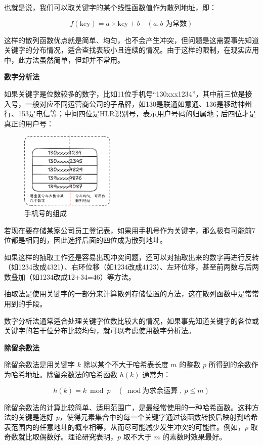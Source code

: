 \documentclass[lang=cn,newtx,10pt,scheme=chinese]{../elegantbook}
\begin{document}
也就是说，我们可以取关键字的某个线性函数值作为散列地址，即：

\[
f(\text{key}) = a \times \text{key} + b \quad (a, b \text{ 为常数})
\]

这样的散列函数优点就是简单、均匀，也不会产生冲突，但问题是这需要事先知道关键字的分布情况，适合查找表较小且连续的情况。由于这样的限制，在现实应用中，此方法虽然简单，但却并不常用。

\textbf{数字分析法}

如果关键字是位数较多的数字，比如11位手机号“130xxx1234”，其中前三位是接入号，一般对应不同运营商公司的子品牌，如130是联通如意通、136是移动神州行、153是电信等；中间四位是HLR识别号，表示用户号码的归属地；后四位才是真正的用户号：

\begin{figure}[!htbp]
  \centering
  \includegraphics[width=0.4\textwidth]{./figure/pdf/cropped/digital_judge.pdf}
  \caption{手机号的组成}
  \label{fig:phoneNumber}
\end{figure}

若现在要存储某家公司员工登记表，如果用手机号作为关键字，那么极有可能前7位都是相同的，因此选择后面的四位成为散列地址。

如果这样的抽取工作还是容易出现冲突问题，还可以对抽取出来的数字再进行反转（如1234改成4321）、右环位移（如1234改成4123）、左环位移，甚至前两数与后两数叠加（如1234改成12+34=46）等方法。

抽取法是使用关键字的一部分来计算散列存储位置的方法，这在散列函数中是常常用到的手段。

数字分析法通常适合处理关键字位数比较大的情况，如果事先知道关键字的各位或关键字的若干位分布比较均匀，就可以考虑使用数字分析法。

\textbf{除留余数法}

除留余数法是用关键字 $k$ 除以某个不大于哈希表长度 $m$ 的整数 $p$ 所得到的余数作为哈希地址。除留余数法的哈希函数 $h(k)$ 通常为：

\[
h(k) = k \bmod p \quad (\bmod \text{为求余运算},\ p \leq m)
\]

除留余数法的计算比较简单、适用范围广，是最经常使用的一种哈希函数。这种方法的关键是选好 $p$，使得元素集合中的每一个关键字通过该函数转换后映射到哈希表范围内的任意地址的概率相等，从而尽可能减少发生冲突的可能性。例如，$p$ 取奇数就比取偶数好。理论研究表明，$p$ 取不大于 $m$ 的素数时效果最好。
\end{document}
